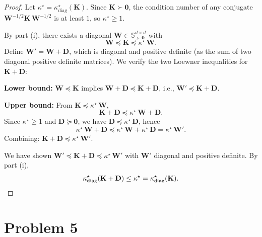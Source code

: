 \documentclass[12pt]{article}
\begin{document}
\begin{proof}
Let $\kappa^\star = \kappa^\star_{\mathrm{diag}}(\mathbf{K})$. Since $\mathbf{K} \succ \mathbf{0}$, the condition number of any conjugate $\mathbf{W}^{-1/2}\mathbf{K}\,\mathbf{W}^{-1/2}$ is at least $1$, so $\kappa^\star \ge 1$.

By part (i), there exists a diagonal $\mathbf{W} \in \mathbb{S}^{d \times d}_{\succ \mathbf{0}}$ with
\[
\mathbf{W} \preceq \mathbf{K} \preceq \kappa^\star\,\mathbf{W}.
\]
Define $\mathbf{W}' = \mathbf{W} + \mathbf{D}$, which is diagonal and positive definite (as the sum of two diagonal positive definite matrices). We verify the two Loewner inequalities for $\mathbf{K} + \mathbf{D}$:

\textbf{Lower bound:}\; $\mathbf{W} \preceq \mathbf{K}$ implies $\mathbf{W} + \mathbf{D} \preceq \mathbf{K} + \mathbf{D}$, i.e., $\mathbf{W}' \preceq \mathbf{K} + \mathbf{D}$.

\textbf{Upper bound:}\; From $\mathbf{K} \preceq \kappa^\star\,\mathbf{W}$,
\[
\mathbf{K} + \mathbf{D} \preceq \kappa^\star\,\mathbf{W} + \mathbf{D}.
\]
Since $\kappa^\star \ge 1$ and $\mathbf{D} \succeq \mathbf{0}$, we have $\mathbf{D} \preceq \kappa^\star\,\mathbf{D}$, hence
\[
\kappa^\star\,\mathbf{W} + \mathbf{D} \preceq \kappa^\star\,\mathbf{W} + \kappa^\star\,\mathbf{D} = \kappa^\star\,\mathbf{W}'.
\]
Combining: $\mathbf{K} + \mathbf{D} \preceq \kappa^\star\,\mathbf{W}'$.

We have shown $\mathbf{W}' \preceq \mathbf{K} + \mathbf{D} \preceq \kappa^\star\,\mathbf{W}'$ with $\mathbf{W}'$ diagonal and positive definite. By part (i),
\[
\kappa^\star_{\mathrm{diag}}(\mathbf{K} + \mathbf{D}) \le \kappa^\star = \kappa^\star_{\mathrm{diag}}(\mathbf{K}). \qedhere
\]
\end{proof}

\section*{Problem 5}
\end{document}
